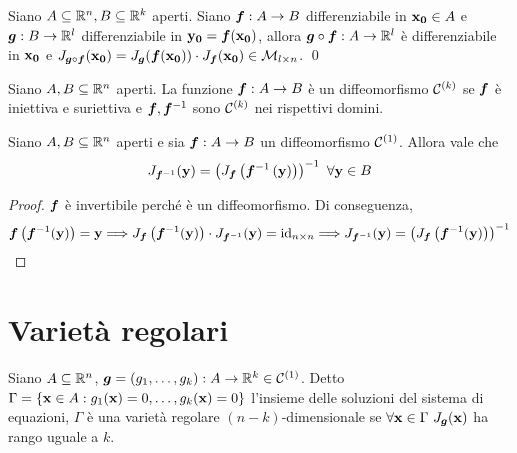 \begin{theorem}
    Siano $A\subseteq \mathbb{R}^n, B \subseteq \mathbb{R}^k$ aperti. Siano $\bm f: A \to B$ differenziabile in $\vb{x_0} \in A$ e $\bm g:B \to \mathbb{R}^l$ differenziabile in $\vb{y_0} = \bm f(\vb{x_0})$, allora $\bm g \circ \bm f : A \to \mathbb{R}^l$ è differenziabile in $\vb{x_0}$ e $J_{\bm g \circ \bm f}(\vb{x_0})=J_{\bm g}(\bm f (\vb{x_0}))\cdot J_{\bm f}(\vb{x_0}) \in \mathcal{M}_{l\times n}$.
    \qed
\end{theorem}

\begin{definition}
    [Diffeomorfismo]
    Siano $A,B \subseteq \mathbb{R}^n$ aperti. La funzione $\bm f: A \to B$ è un diffeomorfismo $\mathcal{C}^{(k)}$ se $\bm f$ è iniettiva e suriettiva e $\bm f, \bm f^{-1}$ sono $\mathcal{C}^{(k)}$ nei rispettivi domini.
\end{definition}

\begin{theorem}
    Siano $A,B \subseteq \mathbb{R}^n$ aperti e sia $\bm f:A\to B$ un diffeomorfismo $\mathcal{C}^{(1)}$. Allora vale che
    $$
        J_{\vecf^{-1}}(\vb{y}) = \left(J_{\vecf}\left(\vecf^{-1}\left(\vb{y}\right)\right) \right)^{-1} \ \forall \vb{y} \in B
    $$
\end{theorem}

\begin{proof}
    $\bm f$ è invertibile perché è un diffeomorfismo. Di conseguenza,
    \begin{gather*}
        \bm f\left(\bm f^{-1}(\vb{y})\right)=\vb{y}
        \Longrightarrow J_{\bm f}\left(\bm f^{-1}(\vb{y})\right)\cdot J_{\bm f^{-1}}(\vb{y})=\text{id}_{n\times n}
        \Longrightarrow J_{\bm f^{-1}}(\vb{y})=\left(J_{\bm f}\left(\bm f^{-1}(\vb{y})\right)\right)^{-1}
    \end{gather*}
\end{proof}

\section{Varietà regolari}

\begin{definition}
    Siano $A \subseteq \mathbb{R}^n$, $\bm g=(g_1,\dots,g_k):A\to\mathbb{R}^k \in \mathcal{C}^{(1)}$. Detto $\Gamma =\{\vb{x}\in A : g_1(\vb{x})=0,\dots,g_k(\vb{x})=0\}$ l'insieme delle soluzioni del sistema di equazioni, $\Gamma$ è una varietà regolare $(n-k)$-dimensionale se $\forall \vb{x} \in \Gamma \ J_{\bm g}(\vb{x})$ ha rango uguale a $k$.
\end{definition}

